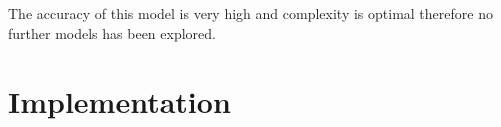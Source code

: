\documentclass{article}
\begin{document}
The accuracy of this model is very high and complexity is optimal therefore no further models has been explored. 

\section{Implementation}
\label{sec:impl}

\end{document}
